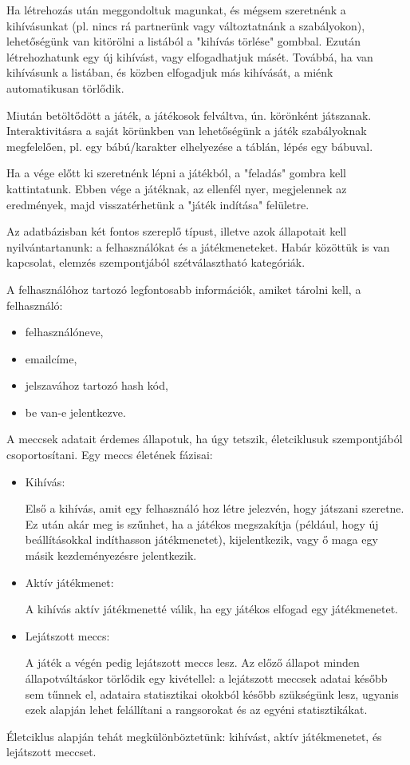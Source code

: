 Ha létrehozás után meggondoltuk magunkat, és mégsem szeretnénk a kihívásunkat (pl. nincs rá partnerünk vagy változtatnánk a szabályokon), lehetőségünk van kitörölni a listából a "kihívás törlése" gombbal. Ezután létrehozhatunk egy új kihívást, vagy elfogadhatjuk másét.
Továbbá, ha van kihívásunk a listában, és közben elfogadjuk más kihívását, a miénk automatikusan törlődik.

Miután betöltődött a játék, a játékosok felváltva, ún. körönként játszanak. Interaktivitásra a saját körünkben van lehetőségünk a játék szabályoknak megfelelően, pl. egy bábú/karakter elhelyezése a táblán, lépés egy bábuval.

Ha a vége előtt ki szeretnénk lépni a játékból, a "feladás" gombra kell kattintatunk. Ebben vége a játéknak, az ellenfél nyer, megjelennek az eredmények, majd visszatérhetünk a "játék indítása" felületre.



Az adatbázisban két fontos szereplő típust, illetve azok állapotait kell nyilvántartanunk: a felhasználókat és a játékmeneteket. Habár közöttük is van kapcsolat, elemzés szempontjából szétválasztható kategóriák.

A felhasználóhoz tartozó legfontosabb információk, amiket tárolni kell, a felhasználó:
\begin{itemize}
	\item felhasználóneve,
	\item emailcíme,
	\item jelszavához tartozó hash kód,
	\item be van-e jelentkezve.
\end{itemize}

A meccsek adatait érdemes állapotuk, ha úgy tetszik, életciklusuk szempontjából csoportosítani. Egy meccs életének fázisai:
\begin{itemize}
	\item Kihívás:
	
	Első a kihívás, amit egy felhasználó hoz létre jelezvén, hogy játszani szeretne.
	Ez után akár meg is szűnhet, ha a játékos megszakítja (például, hogy új beállításokkal indíthasson játékmenetet), kijelentkezik, vagy ő maga egy másik kezdeményezésre jelentkezik.
	\item Aktív játékmenet:
	
	A kihívás aktív játékmenetté válik, ha egy játékos elfogad egy játékmenetet.
	\item Lejátszott meccs:
	
	A játék a végén pedig lejátszott meccs lesz. Az előző állapot minden állapotváltáskor törlődik egy kivétellel: a lejátszott meccsek adatai később sem tűnnek el, adataira statisztikai okokból később szükségünk lesz, ugyanis ezek alapján lehet felállítani a rangsorokat és az egyéni statisztikákat.
\end{itemize}
Életciklus alapján tehát megkülönböztetünk: kihívást, aktív játékmenetet, és lejátszott meccset.

